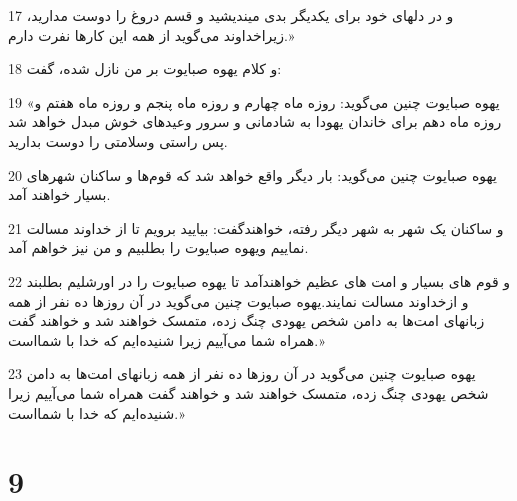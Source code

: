 \par 17 و در دلهای خود برای یکدیگر بدی میندیشید و قسم دروغ را دوست مدارید، زیراخداوند می‌گوید از همه این کارها نفرت دارم.»
\par 18 و کلام یهوه صبایوت بر من نازل شده، گفت:
\par 19 «یهوه صبایوت چنین می‌گوید: روزه ماه چهارم و روزه ماه پنجم و روزه ماه هفتم و روزه ماه دهم برای خاندان یهودا به شادمانی و سرور وعیدهای خوش مبدل خواهد شد پس راستی وسلامتی را دوست بدارید.
\par 20 یهوه صبایوت چنین می‌گوید: بار دیگر واقع خواهد شد که قوم‌ها و ساکنان شهرهای بسیار خواهند آمد.
\par 21 و ساکنان یک شهر به شهر دیگر رفته، خواهندگفت: بیایید برویم تا از خداوند مسالت نماییم ویهوه صبایوت را بطلبیم و من نیز خواهم آمد.
\par 22 و قوم های بسیار و امت های عظیم خواهندآمد تا یهوه صبایوت را در اورشلیم بطلبند و ازخداوند مسالت نمایند.یهوه صبایوت چنین می‌گوید در آن روزها ده نفر از همه زبانهای امت‌ها به دامن شخص یهودی چنگ زده، متمسک خواهند شد و خواهند گفت همراه شما می‌آییم زیرا شنیده‌ایم که خدا با شمااست.»
\par 23 یهوه صبایوت چنین می‌گوید در آن روزها ده نفر از همه زبانهای امت‌ها به دامن شخص یهودی چنگ زده، متمسک خواهند شد و خواهند گفت همراه شما می‌آییم زیرا شنیده‌ایم که خدا با شمااست.»

\chapter{9}

